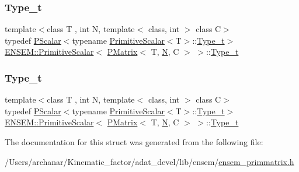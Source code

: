 \subsubsection{\texorpdfstring{Type\_t}{Type\_t}\hspace{0.1cm}{\footnotesize\ttfamily [1/2]}}
{\footnotesize\ttfamily template$<$class T , int N, template$<$ class, int $>$ class C$>$ \\
typedef \mbox{\hyperlink{classENSEM_1_1PScalar}{P\+Scalar}}$<$typename \mbox{\hyperlink{structENSEM_1_1PrimitiveScalar}{Primitive\+Scalar}}$<$T$>$\+::\mbox{\hyperlink{structENSEM_1_1PrimitiveScalar_3_01PMatrix_3_01T_00_01N_00_01C_01_4_01_4_a86d4d1fddfae8c6be655a4b763d59f64}{Type\+\_\+t}}$>$ \mbox{\hyperlink{structENSEM_1_1PrimitiveScalar}{E\+N\+S\+E\+M\+::\+Primitive\+Scalar}}$<$ \mbox{\hyperlink{classENSEM_1_1PMatrix}{P\+Matrix}}$<$ T, \mbox{\hyperlink{operator__name__util_8cc_a7722c8ecbb62d99aee7ce68b1752f337}{N}}, C $>$ $>$\+::\mbox{\hyperlink{structENSEM_1_1PrimitiveScalar_3_01PMatrix_3_01T_00_01N_00_01C_01_4_01_4_a86d4d1fddfae8c6be655a4b763d59f64}{Type\+\_\+t}}}

\mbox{\label{structENSEM_1_1PrimitiveScalar_3_01PMatrix_3_01T_00_01N_00_01C_01_4_01_4_a86d4d1fddfae8c6be655a4b763d59f64}} 
\subsubsection{\texorpdfstring{Type\_t}{Type\_t}\hspace{0.1cm}{\footnotesize\ttfamily [2/2]}}
{\footnotesize\ttfamily template$<$class T , int N, template$<$ class, int $>$ class C$>$ \\
typedef \mbox{\hyperlink{classENSEM_1_1PScalar}{P\+Scalar}}$<$typename \mbox{\hyperlink{structENSEM_1_1PrimitiveScalar}{Primitive\+Scalar}}$<$T$>$\+::\mbox{\hyperlink{structENSEM_1_1PrimitiveScalar_3_01PMatrix_3_01T_00_01N_00_01C_01_4_01_4_a86d4d1fddfae8c6be655a4b763d59f64}{Type\+\_\+t}}$>$ \mbox{\hyperlink{structENSEM_1_1PrimitiveScalar}{E\+N\+S\+E\+M\+::\+Primitive\+Scalar}}$<$ \mbox{\hyperlink{classENSEM_1_1PMatrix}{P\+Matrix}}$<$ T, \mbox{\hyperlink{operator__name__util_8cc_a7722c8ecbb62d99aee7ce68b1752f337}{N}}, C $>$ $>$\+::\mbox{\hyperlink{structENSEM_1_1PrimitiveScalar_3_01PMatrix_3_01T_00_01N_00_01C_01_4_01_4_a86d4d1fddfae8c6be655a4b763d59f64}{Type\+\_\+t}}}



The documentation for this struct was generated from the following file\+:\begin{DoxyCompactItemize}
\item 
/\+Users/archanar/\+Kinematic\+\_\+factor/adat\+\_\+devel/lib/ensem/\mbox{\hyperlink{lib_2ensem_2ensem__primmatrix_8h}{ensem\+\_\+primmatrix.\+h}}\end{DoxyCompactItemize}
